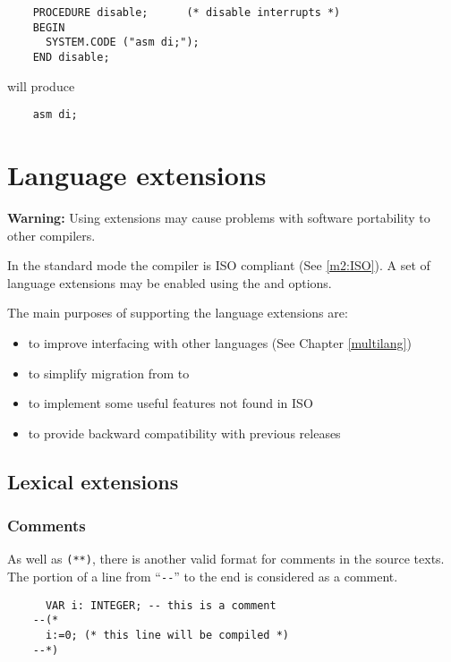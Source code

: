 \Example
\begin{verbatim}
    PROCEDURE disable;      (* disable interrupts *)
    BEGIN
      SYSTEM.CODE ("asm di;");
    END disable;
\end{verbatim}
will produce

\verb'    asm di;'

\fi


\section{Language extensions}\label{m2:ext}

{\bf Warning:} Using extensions may cause problems with software
portability to other compilers.

In the standard mode the \xds{} \mt{} compiler is ISO compliant
(See \ref{m2:ISO}). A set of language extensions may be enabled
using the  and  options.

The main purposes of supporting the language extensions are:
\begin{itemize}
\item to improve interfacing with other languages
      (See Chapter \ref{multilang})
\item to simplify migration from \mt{} to \ot{}
\item to implement some useful features not found in ISO \mt{}
\item to provide backward compatibility with previous releases
\end{itemize}

\subsection{Lexical extensions}

\subsubsection{Comments}

\mextonly

As well as \verb|(**)|, there is another valid format for comments in
the source texts. The portion of a line from ``\verb|--|''
to the end is considered as a comment.

\begin{verbatim}
      VAR i: INTEGER; -- this is a comment
    --(*
      i:=0; (* this line will be compiled *)
    --*)
\end{verbatim}


